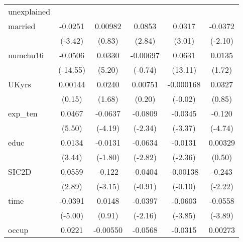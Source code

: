 \begin{table}[htbp]
\begin{tabular}{l*{5}{c}}
\hline
unexplained &                     &                     &                     &                     &                     \\
married     &     -0.0251\sym{***}&     0.00982         &      0.0853\sym{**} &      0.0317\sym{**} &     -0.0372\sym{*}  \\
            &     (-3.42)         &      (0.83)         &      (2.84)         &      (3.01)         &     (-2.10)         \\
numchu16    &     -0.0506\sym{***}&      0.0330\sym{***}&    -0.00697         &      0.0631\sym{***}&      0.0135         \\
            &    (-14.55)         &      (5.20)         &     (-0.74)         &     (13.11)         &      (1.72)         \\
UKyrs       &     0.00144         &      0.0240         &     0.00751         &   -0.000168         &      0.0327         \\
            &      (0.15)         &      (1.68)         &      (0.20)         &     (-0.02)         &      (0.85)         \\
exp\_ten     &      0.0467\sym{***}&     -0.0637\sym{***}&     -0.0809\sym{*}  &     -0.0345\sym{***}&      -0.120\sym{***}\\
            &      (5.50)         &     (-4.19)         &     (-2.34)         &     (-3.37)         &     (-4.74)         \\
educ        &      0.0134\sym{***}&     -0.0131         &     -0.0634\sym{**} &     -0.0131\sym{*}  &     0.00329         \\
            &      (3.44)         &     (-1.80)         &     (-2.82)         &     (-2.36)         &      (0.50)         \\
SIC2D       &      0.0559\sym{**} &      -0.122\sym{**} &     -0.0404         &    -0.00138         &      -0.243\sym{*}  \\
            &      (2.89)         &     (-3.15)         &     (-0.91)         &     (-0.10)         &     (-2.22)         \\
time        &     -0.0391\sym{***}&      0.0148         &     -0.0397\sym{*}  &     -0.0603\sym{***}&     -0.0558\sym{***}\\
            &     (-5.00)         &      (0.91)         &     (-2.16)         &     (-3.85)         &     (-3.89)         \\
occup       &      0.0221\sym{***}&    -0.00550         &     -0.0568\sym{**} &     -0.0315\sym{***}&     0.00273         \\

\end{tabular}
\end{table}
